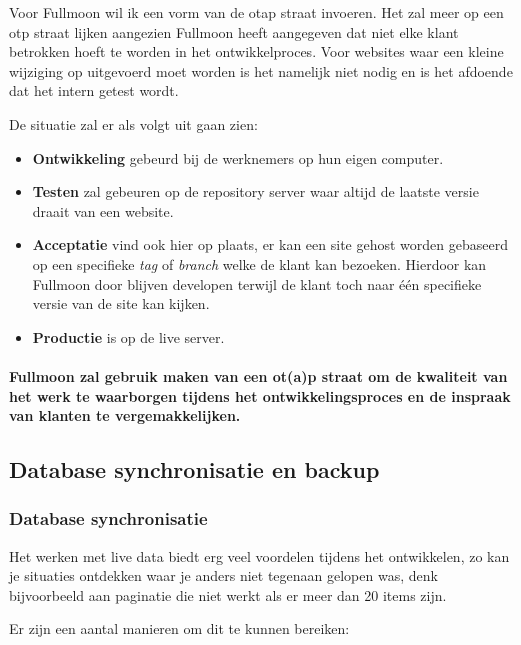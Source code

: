 \documentclass[12pt,a4paper]{article}
\begin{document}
    Voor Fullmoon wil ik een vorm van de {\sc otap} straat invoeren. Het zal meer op een {\sc otp} straat lijken aangezien Fullmoon heeft aangegeven dat niet elke klant betrokken hoeft te worden in het ontwikkelproces. Voor websites waar een kleine wijziging op uitgevoerd moet worden is het namelijk niet nodig en is het afdoende dat het intern getest wordt.
    
    De situatie zal er als volgt uit gaan zien:
    
    \begin{itemize}
      \item \textbf{Ontwikkeling} gebeurd bij de werknemers op hun eigen computer.
      \item \textbf{Testen} zal gebeuren op de repository server waar altijd de laatste versie draait van een website.
      \item \textbf{Acceptatie} vind ook hier op plaats, er kan een site gehost worden gebaseerd op een specifieke \emph{tag} of \emph{branch} welke de klant kan bezoeken. Hierdoor kan Fullmoon door blijven developen terwijl de klant toch naar \'{e}\'{e}n specifieke versie van de site kan kijken.
      \item \textbf{Productie} is op de live server.
    \end{itemize}
    
    \paragraph{Fullmoon zal gebruik maken van een {\sc ot(a)p} straat om de kwaliteit van het werk te waarborgen tijdens het ontwikkelingsproces en de inspraak van klanten te vergemakkelijken.}
    
    \subsection{Database synchronisatie en backup}
    
    \subsubsection{Database synchronisatie}
    
    Het werken met live data biedt erg veel voordelen tijdens het ontwikkelen, zo kan je situaties ontdekken waar je anders niet tegenaan gelopen was, denk bijvoorbeeld aan paginatie die niet werkt als er meer dan 20 items zijn. 
    
    Er zijn een aantal manieren om dit te kunnen bereiken:
    
\end{document}

